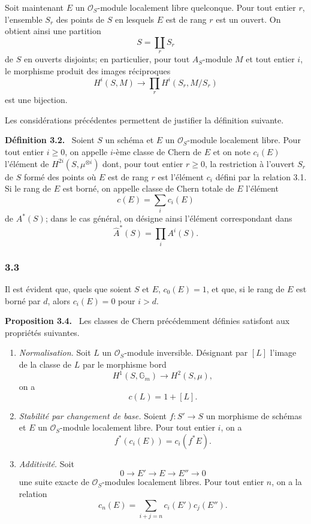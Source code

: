 \documentclass[11pt]{article}
\newenvironment{statement}[1]{\par\medskip\noindent\textbf{#1.}\ }{\par\medskip}
\begin{document}
Soit maintenant $E$ un $\mathcal O_S$-module localement libre quelconque. Pour tout entier $r$, l'ensemble $S_r$ des points de $S$ en lesquels $E$ est de rang $r$ est un ouvert. On obtient ainsi une partition
\[
S=\coprod_r S_r
\]
de $S$ en ouverts disjoints; en particulier, pour tout $A_S$-module $M$ et tout entier $i$, le morphisme produit des images réciproques
\[
H^i(S,M)\longrightarrow \prod_r H^i(S_r,M/S_r)
\]
est une bijection.

Les considérations précédentes permettent de justifier la définition suivante.

\begin{statement}{Définition 3.2}
Soient $S$ un schéma et $E$ un $\mathcal O_S$-module localement libre. Pour tout entier $i\ge0$, on appelle $i$-ème classe de Chern de $E$ et on note $c_i(E)$ l'élément de $H^{2i}(S,\mu^{\otimes i})$ dont, pour tout entier $r\ge0$, la restriction à l'ouvert $S_r$ de $S$ formé des points où $E$ est de rang $r$ est l'élément $c_i$ défini par la relation 3.1. Si le rang de $E$ est borné, on appelle classe de Chern totale de $E$ l'élément
\[
c(E)=\sum_i c_i(E)
\]
de $A^*(S)$; dans le cas général, on désigne ainsi l'élément correspondant dans
\[
\widehat A^*(S)=\prod_i A^i(S).
\]
\end{statement}

\subsubsection*{3.3}
Il est évident que, quels que soient $S$ et $E$, $c_0(E)=1$, et que, si le rang de $E$ est borné par $d$, alors $c_i(E)=0$ pour $i>d$.

\begin{statement}{Proposition 3.4}
Les classes de Chern précédemment définies satisfont aux propriétés suivantes.
\begin{enumerate}[label=(\roman*)]
\item \emph{Normalisation.} Soit $L$ un $\mathcal O_S$-module inversible. Désignant par $[L]$ l'image de la classe de $L$ par le morphisme bord
\[
H^1(S,\mathbb G_m)\longrightarrow H^2(S,\mu),
\]
on a
\[
c(L)=1+[L].
\]
\item \emph{Stabilité par changement de base.} Soient $f:S'\to S$ un morphisme de schémas et $E$ un $\mathcal O_S$-module localement libre. Pour tout entier $i$, on a
\[
f^*(c_i(E))=c_i(f^*E).
\]
\item \emph{Additivité.} Soit
\[
0\to E'\to E\to E''\to0
\]
une suite exacte de $\mathcal O_S$-modules localement libres. Pour tout entier $n$, on a la relation
\[
c_n(E)=\sum_{i+j=n}c_i(E')c_j(E'').
\]
\end{enumerate}
\end{statement}
\end{document}
